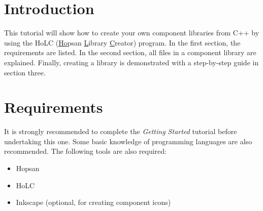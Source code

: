 \documentclass[a4paper,pdftex]{article}
\begin{document}

\section*{Introduction}
This tutorial will show how to create your own component libraries from C++ by using the HoLC (\underline{Ho}psan \underline{L}ibrary \underline{C}reator) program. In the first section, the requirements are listed. In the second section, all files in a component library are explained. Finally, creating a library is demonstrated with a step-by-step guide in section three.

\section*{Requirements}
It is strongly recommended to complete the \textit{Getting Started} tutorial before undertaking this one. Some basic knowledge of programming languages are also recommended. 
The following tools are also required:
%
\begin{itemize} %
\itemsep -3pt
\item Hopsan
\item HoLC 
\item Inkscape (optional, for creating component icons)
\end{itemize} %
\end{document}
